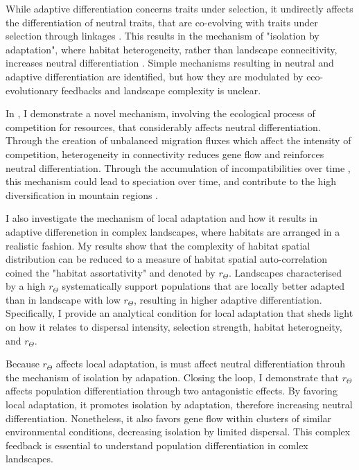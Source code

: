 % 
While adaptive differentiation concerns traits under selection, it undirectly affects the differentiation of neutral traits, that are co-evolving with traits under selection through linkages \cite{XXX}. This results in the mechanism of "isolation by adaptation", where habitat heterogeneity, rather than landscape connecitivity, increases neutral differentiation \cite{nosil2008}. 
% 
Simple mechanisms resulting in neutral and adaptive differentiation are identified, but how they are modulated by eco-evolutionary feedbacks and landscape complexity is unclear. %

In \chapi, I demonstrate a novel mechanism, involving the ecological process of competition for resources, that considerably affects neutral differentiation. Through the creation of unbalanced migration fluxes which affect the intensity of competition, heterogeneity in connectivity reduces gene flow and reinforces neutral differentiation. Through the accumulation of incompatibilities over time \cite{Dobhsanski}, this mechanism could lead to speciation over time, and contribute to the high diversification in mountain regions \cite{Rahbek}.

I also investigate the mechanism of local adaptation and how it results in adaptive differenetion in complex landscapes, where habitats are arranged in a realistic fashion. My results show that the complexity of habitat spatial distribution can be reduced to a measure of habitat spatial auto-correlation coined the "habitat assortativity" and denoted by $r_\Theta$. Landscapes characterised by a high $r_\Theta$ systematically support populations that are locally better adapted than in landscape with low $r_\Theta$, resulting in higher adaptive differentiation. Specifically, I provide an analytical condition for local adaptation that sheds light on how it relates to dispersal intensity, selection strength, habitat heterogneity, and $r_\Theta$.

Because $r_\Theta$ affects local adaptation, is must affect neutral differentiation throuh the mechanism of isolation by adapation. Closing the loop, I demonstrate that $r_\Theta$ affects population differentiation through two antagonistic effects. By favoring local adaptation, it promotes isolation by adaptation, therefore increasing neutral differentiation. Nonetheless, it also favors gene flow within clusters of similar environmental conditions, decreasing isolation by limited dispersal. This complex feedback is essential to understand population differentiation in comlex landscapes.

